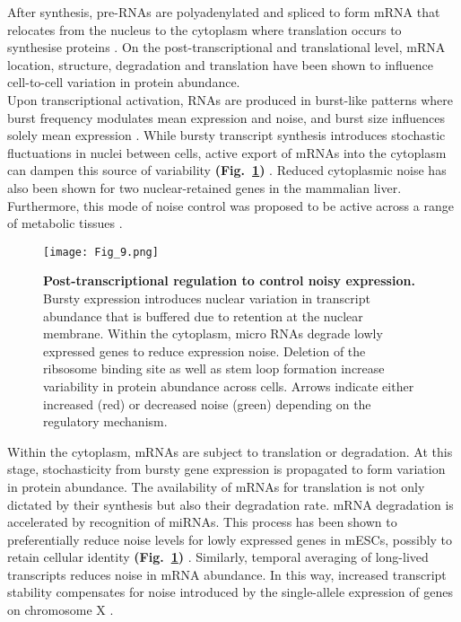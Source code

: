 After synthesis, pre-RNAs are polyadenylated and spliced to form mRNA that relocates from the nucleus to the cytoplasm where translation occurs to synthesise proteins \cite{Glisovic2008}. 
On the post-transcriptional and translational level, mRNA location, structure, degradation and translation have been shown to influence cell-to-cell variation in protein abundance.\\

Upon transcriptional activation, RNAs are produced in burst-like patterns where burst frequency modulates mean expression and noise, and burst size influences solely mean expression \citep{Hornung2012}. 
While bursty transcript synthesis introduces stochastic fluctuations in nuclei between cells, active export of mRNAs into the cytoplasm can dampen this source of variability \textbf{(Fig.~\ref{fig0:posttranscriptional})} \citep{Battich2015a}. 
Reduced cytoplasmic noise has also been shown for two nuclear-retained genes in the mammalian liver. 
Furthermore, this mode of noise control was proposed to be active across a range of metabolic tissues \cite{BaharHalpern2015a}.\\

\begin{figure}[!h]
\centering
\texttt{[image: Fig\_9.png]}
\caption[Post-transcriptional regulation to control noisy expression]{\textbf{Post-transcriptional regulation to control noisy expression.}\\
Bursty expression introduces nuclear variation in transcript abundance that is buffered due to retention at the nuclear membrane. Within the cytoplasm, micro RNAs degrade lowly expressed genes to reduce expression noise. 
Deletion of the ribsosome binding site as well as stem loop formation increase variability in protein abundance across cells. 
Arrows indicate either increased (red) or decreased noise (green) depending on the regulatory mechanism.}
\label{fig0:posttranscriptional}
\end{figure} 

\newpage

Within the cytoplasm, mRNAs are subject to translation or degradation. At this stage, stochasticity from bursty gene expression is propagated to form variation in protein abundance. 
The availability of mRNAs for translation is not only dictated by their synthesis but also their degradation rate. mRNA degradation is accelerated by recognition of \glspl{miRNA}. 
This process has been shown to preferentially reduce noise levels for lowly expressed genes in mESCs, possibly to retain cellular identity \textbf{(Fig.~\ref{fig0:posttranscriptional})} \citep{Schmiedel2015}. 
Similarly, temporal averaging of long-lived transcripts reduces noise in mRNA abundance. 
In this way, increased transcript stability compensates for noise introduced by the single-allele expression of genes on chromosome X \citep{Faure2017}.  \\

